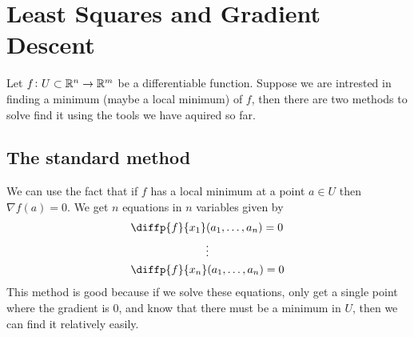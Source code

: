 \documentclass[11pt,a4paper]{article}
\begin{document}
\newpage

\section{Least Squares and Gradient Descent}
Let $f \colon U \subset \mathbb{R}^n \to \mathbb{R}^m$ be a differentiable function.
Suppose we are intrested in finding a minimum (maybe a local minimum) of $f$,
then there are two methods to solve find it using the tools we have aquired
so far.

\subsection{The standard method}
We can use the fact that if $f$ has a local minimum at a point $a \in U$ then
$\nabla f(a) = 0$.
We get $n$ equations in $n$ variables given by
\begin{align*}
  &\diffp{f}{{x_1}}(a_1,\dots,a_n) = 0 \\
  &\vdotswithin{\diffp{f}{{x_n}}(a_1,\dots,a_n) = 0} \\
  &\diffp{f}{{x_n}}(a_1,\dots,a_n) = 0
\end{align*}
This method is good because if we solve these equations, only get a single
point where the gradient is $0$, and know that there must be a minimum in $U$,
then we can find it relatively easily.
\end{document}
